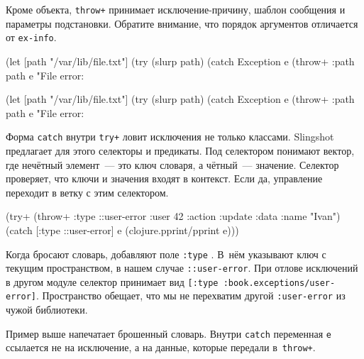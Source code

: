 \fi

Кроме объекта, \verb|throw+| принимает исключение-причину, шаблон сообщения и
параметры подстановки. Обратите внимание, что порядок аргументов отличается от
\verb|ex-info|.

\ifx\devicetype\mobile

\begin{english}
  \begin{clojure}
(let [path "/var/lib/file.txt"]
  (try
    (slurp path)
    (catch Exception e
      (throw+ {:path path} e
      "File error: %
  \end{clojure}
\end{english}

\else

\begin{english}
  \begin{clojure}
(let [path "/var/lib/file.txt"]
  (try
    (slurp path)
    (catch Exception e
      (throw+ {:path path} e "File error: %
  \end{clojure}
\end{english}

\fi


Форма \verb|catch| внутри \verb|try+| ловит исключения не только
классами. Slingshot предлагает для этого селекторы и предикаты. Под селектором
понимают вектор, где нечётный элемент~--- это ключ словаря, а чётный~---
значение. Селектор проверяет, что ключи и значения входят в контекст. Если да,
управление переходит в ветку с этим селектором.

\begin{english}
  \begin{clojure/lines}
(try+
 (throw+ {:type ::user-error
          :user 42
          :action :update
          :data {:name "Ivan"}})
 (catch [:type ::user-error] e
   (clojure.pprint/pprint e)))
  \end{clojure/lines}
\end{english}

Когда бросают словарь, добавляют поле \verb|:type| . В~нём указывают
ключ с текущим пространством, в нашем случае \verb|::user-error|. При отлове
исключений в другом модуле селектор принимает вид
\verb|[:type :book.exceptions/user-error]|. Пространство обещает, что мы не
перехватим другой \verb|:user-error| из чужой библиотеки.

Пример выше напечатает брошенный словарь. Внутри \verb|catch| переменная
\verb|e| ссылается не на исключение, а на данные, которые передали
в~\verb|throw+|.

